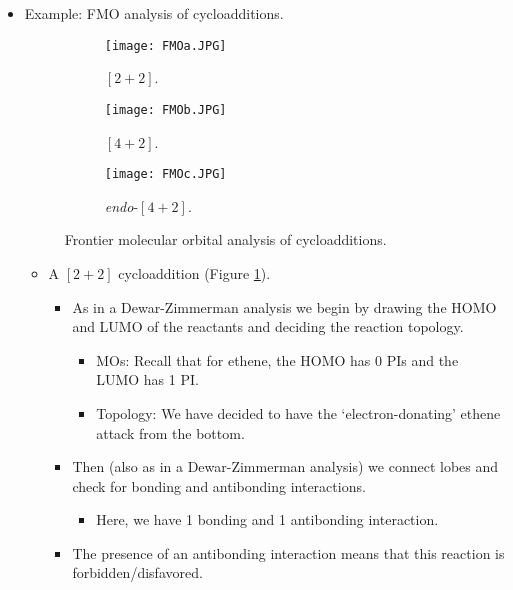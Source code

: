 \documentclass[../notes.tex]{subfiles}
\begin{document}
\begin{itemize}
    \item Example: FMO analysis of cycloadditions.
    \begin{figure}[h!]
        \centering
        \begin{subfigure}[b]{0.3\linewidth}
            \centering
            \texttt{[image: FMOa.JPG]}
            \caption{$[2+2]$.}
            \label{fig:FMOa}
        \end{subfigure}
        \begin{subfigure}[b]{0.3\linewidth}
            \centering
            \texttt{[image: FMOb.JPG]}
            \caption{$[4+2]$.}
            \label{fig:FMOb}
        \end{subfigure}
        \begin{subfigure}[b]{0.3\linewidth}
            \centering
            \texttt{[image: FMOc.JPG]}
            \caption{\emph{endo}-$[4+2]$.}
            \label{fig:FMOc}
        \end{subfigure}
        \caption{Frontier molecular orbital analysis of cycloadditions.}
        \label{fig:FMO}
    \end{figure}
    \begin{itemize}
        \item A $[2+2]$ cycloaddition (Figure \ref{fig:FMOa}).
        \begin{itemize}
            \item As in a Dewar-Zimmerman analysis we begin by drawing the HOMO and LUMO of the reactants and deciding the reaction topology.
            \begin{itemize}
                \item MOs: Recall that for ethene, the HOMO has 0 PIs and the LUMO has 1 PI.
                \item Topology: We have decided to have the `electron-donating' ethene attack from the bottom.
            \end{itemize}
            \item Then (also as in a Dewar-Zimmerman analysis) we connect lobes and check for bonding and antibonding interactions.
            \begin{itemize}
                \item Here, we have 1 bonding and 1 antibonding interaction.
            \end{itemize}
            \item The presence of an antibonding interaction means that this reaction is forbidden/disfavored.

\end{itemize}
\end{itemize}
\end{itemize}
\end{document}

